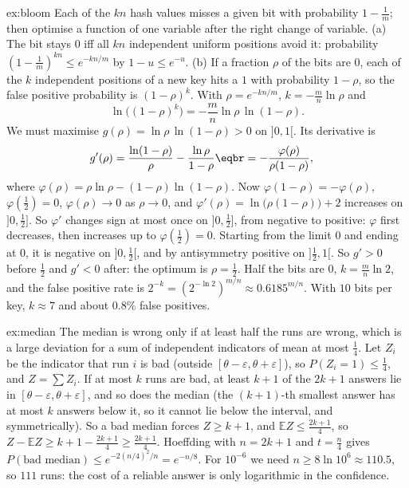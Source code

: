 \begin{solution}{ex:bloom}
\idea Each of the $kn$ hash values misses a given bit with probability $1-\frac1m$; then optimise a function of one
variable after the right change of variable.
\writeup (a) The bit stays $0$ iff all $kn$ independent uniform positions avoid it: probability $(1-\frac1m)^{kn}\le e^{-kn/m}$ by $1-u\le e^{-u}$.
(b) If a fraction $\rho$ of the bits are $0$, each of the $k$ independent positions of a new key hits a $1$ with probability $1-\rho$, so
the false positive probability is $(1-\rho)^k$. With $\rho=e^{-kn/m}$, $k=-\frac mn\ln\rho$ and
\[
\ln\bigl((1-\rho)^k\bigr)=-\frac mn\ln\rho\,\ln(1-\rho).
\]
We must maximise $g(\rho)=\ln\rho\,\ln(1-\rho)>0$ on $]0,1[$. Its derivative is
\[
\begin{aligned}g'(\rho)&=\frac{\ln(1-\rho)}\rho-\frac{\ln\rho}{1-\rho}\eqbr=-\frac{\varphi(\rho)}{\rho(1-\rho)},\end{aligned}
\]
where $\varphi(\rho)=\rho\ln\rho-(1-\rho)\ln(1-\rho)$.
Now $\varphi(1-\rho)=-\varphi(\rho)$, $\varphi(\frac12)=0$, $\varphi(\rho)\to0$ as $\rho\to0$, and $\varphi'(\rho)=\ln\bigl(\rho(1-\rho)\bigr)+2$ increases on $]0,\frac12]$. So $\varphi'$ changes sign
at most once on $]0,\frac12]$, from negative to positive: $\varphi$ first decreases, then increases up to $\varphi(\frac12)=0$. Starting from the limit $0$
and ending at $0$, it is negative on $]0,\frac12[$, and by antisymmetry positive on $]\frac12,1[$. So $g'>0$ before $\frac12$ and $g'<0$ after:
the optimum is $\rho=\frac12$. Half the bits are $0$, $k=\frac mn\ln2$, and the
false positive rate is $2^{-k}=(2^{-\ln2})^{m/n}\approx0.6185^{m/n}$. With $10$ bits per key, $k\approx7$ and about $0.8\%$ false positives.
\end{solution}

\begin{solution}{ex:median}
\idea The median is wrong only if at least half the runs are wrong, which is a large deviation for a sum of
independent indicators of mean at most $\frac14$.
\writeup Let $Z_i$ be the indicator that run $i$ is bad (outside $[\theta-\varepsilon,\theta+\varepsilon]$), so $P(Z_i=1)\le\frac14$, and $Z=\sum Z_i$. If at most $k$
runs are bad, at least $k+1$ of the $2k+1$ answers lie in $[\theta-\varepsilon,\theta+\varepsilon]$, and so does the median (the $(k+1)$-th smallest
answer has at most $k$ answers below it, so it cannot lie below the interval, and symmetrically). So a bad median
forces $Z\ge k+1$, and $\mathbb EZ\le\frac{2k+1}4$, so $Z-\mathbb EZ\ge k+1-\frac{2k+1}4\ge\frac{2k+1}4$. Hoeffding with $n=2k+1$ and $t=\frac n4$ gives
$P(\text{bad median})\le e^{-2(n/4)^2/n}=e^{-n/8}$. For $10^{-6}$ we need $n\ge8\ln10^6\approx110.5$, so $111$ runs: the cost of a reliable
answer is only logarithmic in the confidence.
\end{solution}

